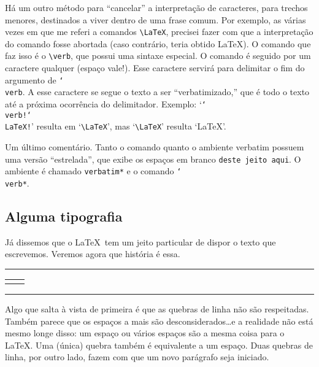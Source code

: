 Há um outro método para ``cancelar'' a interpretação de caracteres,
para trechos menores, destinados a viver dentro de uma frase
comum. Por exemplo, as várias vezes em que me referi a comandos
\verb'\LaTeX', precisei fazer com que a interpretação do comando fosse
abortada (caso contrário, teria obtido \LaTeX). O comando que faz isso
é o \verb'\verb', que possui uma sintaxe especial. O comando é seguido
por um caractere qualquer (espaço vale!). Esse caractere servirá para
delimitar o fim do argumento de \texttt{\char`\\{}verb}. A esse
caractere se segue o texto a ser ``verbatimizado,'' que é todo o texto
até a próxima ocorrência do delimitador. Exemplo:
`\texttt{\char`\\{}verb!\char`\\LaTeX!}' resulta em `\verb!\LaTeX!',
mas `\verb'\LaTeX'' resulta `\LaTeX'.

Um último comentário. Tanto o comando quanto o ambiente verbatim
possuem uma versão ``estrelada'', que exibe os espaços em branco
\verb*'deste jeito aqui'. O ambiente é chamado \verb'verbatim*' e o comando
\texttt{\char`\\{}verb*}. 

\subsection{Alguma tipografia}

Já dissemos que o \LaTeX\ tem um jeito particular de dispor o texto
que escrevemos. Veremos agora que história é essa.

\medskip
\noindent\begin{minipage}{\textwidth}
\begin{center}\footnotesize\hrule\smallskip
\begin{tabular}{c|c}
\begin{minipage}{.465\textwidth}

\end{minipage} &
\begin{minipage}{.465\textwidth}

\end{minipage}
\end{tabular}
\smallskip\hrule
\end{center}
\end{minipage}
\medskip

Algo que salta à vista de primeira é que as quebras de linha não são
respeitadas. Também parece que os espaços a mais são
desconsiderados\dots e a realidade não está mesmo longe disso: um
espaço ou vários espaços são a mesma coisa para o \LaTeX. Uma (única)
quebra também é equivalente a um espaço. Duas quebras de linha, por
outro lado, fazem com que um novo parágrafo seja iniciado.

